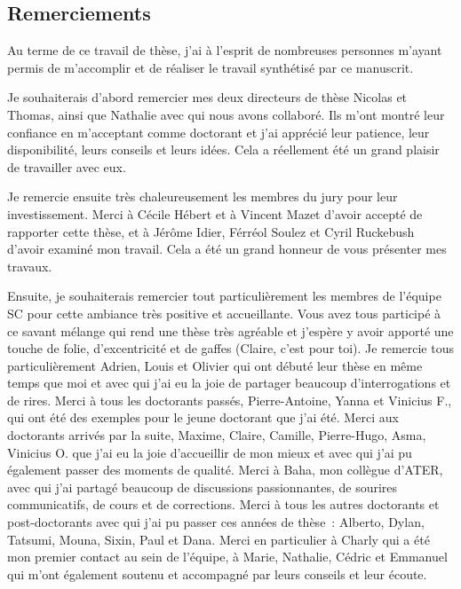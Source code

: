 
\begin{fullwidth}
\chapter*{Remerciements} %
\label{ch:remerciements}

    Au terme de ce travail de thèse, j'ai à l'esprit de nombreuses personnes m'ayant permis de m'accomplir et de réaliser le travail synthétisé par ce manuscrit.
    
    Je souhaiterais d'abord remercier mes deux directeurs de thèse Nicolas et Thomas, ainsi que Nathalie avec qui nous avons collaboré. Ils m'ont montré leur confiance en m'acceptant comme doctorant et j'ai apprécié leur patience, leur disponibilité, leurs conseils et leurs idées. Cela a réellement été un grand plaisir de travailler avec eux.
    
    Je remercie ensuite très chaleureusement les membres du jury pour leur investissement. Merci à Cécile Hébert et à Vincent Mazet d'avoir accepté de rapporter cette thèse, et à Jérôme Idier, Férréol Soulez et Cyril Ruckebush d'avoir examiné mon travail. Cela a été un grand honneur de vous présenter mes travaux.
    
    Ensuite, je souhaiterais remercier tout particulièrement les membres de l'équipe \textsc{SC} pour cette ambiance très positive et accueillante. Vous avez tous participé à ce savant mélange qui rend une thèse très agréable et j'espère y avoir apporté une touche de folie, d'excentricité et de gaffes (Claire, c'est pour toi). 
    Je remercie tous particulièrement Adrien, Louis et Olivier qui ont débuté leur thèse en même temps que moi et avec qui j'ai eu la joie de partager beaucoup d'interrogations et de rires. Merci à tous les doctorants passés, Pierre-Antoine, Yanna et Vinicius F., qui ont été des exemples pour le jeune doctorant que j'ai été. Merci aux doctorants arrivés par la suite, Maxime, Claire, Camille, Pierre-Hugo, Asma, Vinicius O. que j'ai eu la joie d'accueillir de mon mieux et avec qui j'ai pu également passer des moments de qualité. 
    Merci à Baha, mon collègue d'ATER, avec qui j'ai partagé beaucoup de discussions passionnantes, de sourires communicatifs, de cours et de corrections.
    Merci à tous les autres doctorants et post-doctorants avec qui j'ai pu passer ces années de thèse~: Alberto, Dylan, Tatsumi, Mouna, Sixin, Paul et Dana.
    Merci en particulier à Charly qui a été mon premier contact au sein de l'équipe, à Marie, Nathalie, Cédric et Emmanuel qui m'ont également soutenu et accompagné par leurs conseils et leur écoute.
    

\end{fullwidth}
